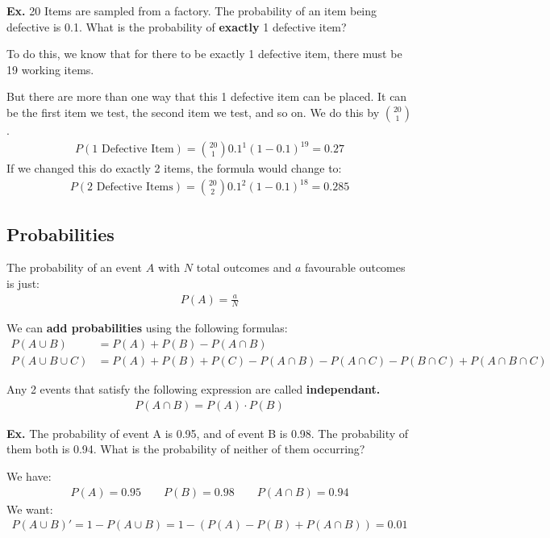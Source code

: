 \documentclass[12pt,letterpaper]{article} \usepackage{amsmath} \usepackage{graphicx} \usepackage[margin=1in]{geometry} \usepackage{longtable}  \usepackage{amssymb}
\begin{document}
	\begin{mdframed}
	\textbf{Ex. }20 Items are sampled from a factory. The probability of an item being defective is 0.1. What is the probability of \textbf{exactly} 1 defective item?
	
	To do this, we know that for there to be exactly 1 defective item, there must be 19 working items. 
	
	But there are more than one way that this 1 defective item can be placed. It can be the first item we test, the second item we test, and so on. We do this by $\binom{20}{1}$.
	\begin{align*}
		P(\text{1 Defective Item}) = \binom{20}{1} 0.1^1 (1-0.1)^{19} = 0.27
	\end{align*}
	If we changed this do exactly 2 items, the formula would change to:
	\begin{align*}
		P(\text{2 Defective Items}) = \binom{20}{2} 0.1^2 (1-0.1)^{18} = 0.285
	\end{align*}
	\end{mdframed}
	
	\subsection{Probabilities}
	The probability of an event $A$ with $N$ total outcomes and $a$ favourable outcomes is just:
	\begin{align*}
		P(A) = \frac{a}{N}
	\end{align*}
	
	We can \textbf{add probabilities} using the following formulas:
	\begin{align*}
		P(A\cup B) &= P(A) + P(B) - P(A\cap B) \\
		P(A\cup B \cup C) &= P(A)+P(B)+P(C)-P(A\cap B) - P(A\cap C) - P(B\cap C) + P(A\cap B\cap C)
	\end{align*}

	Any 2 events that satisfy the following expression are called \textbf{independant. }
	\begin{align*}
		P(A\cap B) = P(A)\cdot P(B)
	\end{align*}

	\begin{mdframed}
		\textbf{Ex. }The probability of event A is 0.95, and of event B is 0.98. The probability of them both is 0.94. What is the probability of neither of them occurring?
		
		We have:
		\begin{align*}
			P(A)=0.95\qquad P(B)=0.98\qquad P(A\cap B)=0.94
		\end{align*}
		We want:
		\begin{align*}
			P(A\cup B)\prime = 1-P(A\cup B) = 1- (P(A) - P(B) + P(A\cap B)) = 0.01
		\end{align*}
	\end{mdframed}
\end{document}

